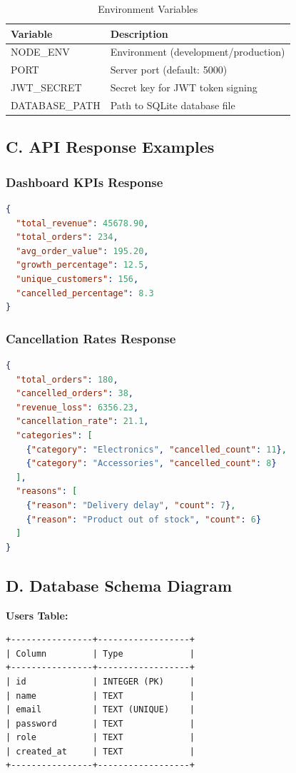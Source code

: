 \documentclass[12pt,a4paper]{article}
\begin{document}
\begin{table}[h]
\centering
\begin{tabular}{|l|p{8cm}|}
\hline
\textbf{Variable} & \textbf{Description} \\
\hline
NODE\_ENV & Environment (development/production) \\
\hline
PORT & Server port (default: 5000) \\
\hline
JWT\_SECRET & Secret key for JWT token signing \\
\hline
DATABASE\_PATH & Path to SQLite database file \\
\hline
\end{tabular}
\caption{Environment Variables}
\end{table}

\subsection{C. API Response Examples}

\subsubsection{Dashboard KPIs Response}
\begin{lstlisting}[language=JSON]
{
  "total_revenue": 45678.90,
  "total_orders": 234,
  "avg_order_value": 195.20,
  "growth_percentage": 12.5,
  "unique_customers": 156,
  "cancelled_percentage": 8.3
}
\end{lstlisting}

\subsubsection{Cancellation Rates Response}
\begin{lstlisting}[language=JSON]
{
  "total_orders": 180,
  "cancelled_orders": 38,
  "revenue_loss": 6356.23,
  "cancellation_rate": 21.1,
  "categories": [
    {"category": "Electronics", "cancelled_count": 11},
    {"category": "Accessories", "cancelled_count": 8}
  ],
  "reasons": [
    {"reason": "Delivery delay", "count": 7},
    {"reason": "Product out of stock", "count": 6}
  ]
}
\end{lstlisting}

\subsection{D. Database Schema Diagram}

\textbf{Users Table:}
\begin{verbatim}
+----------------+------------------+
| Column         | Type             |
+----------------+------------------+
| id             | INTEGER (PK)     |
| name           | TEXT             |
| email          | TEXT (UNIQUE)    |
| password       | TEXT             |
| role           | TEXT             |
| created_at     | TEXT             |
+----------------+------------------+
\end{verbatim}
\end{document}
